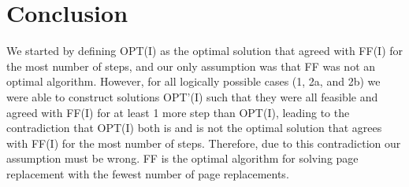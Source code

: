 \documentclass[a4paper]{article}
\begin{document}
\section{Conclusion}
We started by defining OPT(I) as the optimal solution that agreed with FF(I) for the most number of steps, and our only assumption was that FF was not an optimal algorithm. However, for all logically possible cases (1, 2a, and 2b) we were able to construct solutions OPT'(I) such that they were all feasible and agreed with FF(I) for at least 1 more step than OPT(I), leading to the contradiction that OPT(I) both is and is not the optimal solution that agrees with FF(I) for the most number of steps. Therefore, due to this contradiction our assumption must be wrong. FF is the optimal algorithm for solving page replacement with the fewest number of page replacements.
\end{document}
